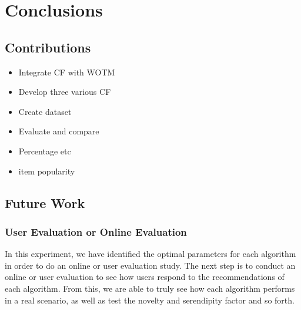\chapter{Conclusions}\label{C:con}


\section{Contributions}
\begin{itemize}
	\item{Integrate CF with WOTM}
	\item{Develop three various CF}
	\item{Create dataset}
	\item{Evaluate and compare}
	\item{Percentage etc}
	\item{item popularity}
\end{itemize}

\section{Future Work}


\subsection{User Evaluation or Online Evaluation}
In this experiment, we have identified the optimal parameters for each algorithm in order to do an online or user evaluation study. The next step is to conduct an online or user evaluation to see how users respond to the recommendations of each algorithm. From this, we are able to truly see how each algorithm performs in a real scenario, as well as test the novelty and serendipity factor and so forth. 

